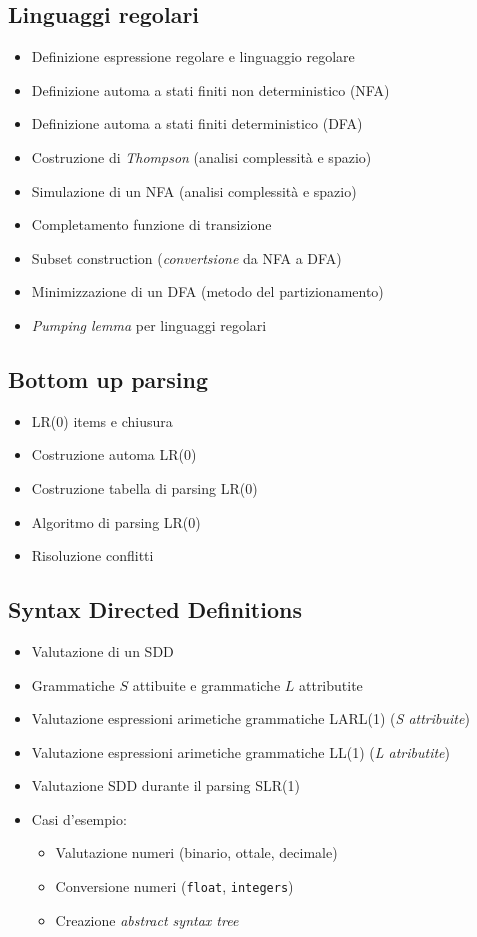 \subsection{Linguaggi regolari}
\begin{itemize}
	\item Definizione espressione regolare e linguaggio regolare
	\item Definizione automa a stati finiti non deterministico (NFA)
	\item Definizione automa a stati finiti deterministico (DFA)
	\item Costruzione di \textit{Thompson} (analisi complessità e spazio)
	\item Simulazione di un NFA (analisi complessità e spazio)
	\item Completamento funzione di transizione
	\item Subset construction (\textit{convertsione} da NFA a DFA)
	\item Minimizzazione di un DFA (metodo del partizionamento)
	\item \textit{Pumping lemma} per linguaggi regolari
\end{itemize}
\subsection{Bottom up parsing}
\begin{itemize}
	\item LR(0) items e chiusura
	\item Costruzione automa LR(0)
	\item Costruzione tabella di parsing LR(0)
	\item Algoritmo di parsing LR(0)
	\item Risoluzione conflitti
\end{itemize}

\subsection{Syntax Directed Definitions}
\begin{itemize}
	\item Valutazione di un SDD
	\item Grammatiche $ S $ attibuite e grammatiche $ L $ attributite
	\item Valutazione espressioni arimetiche grammatiche LARL(1) (\textit{S attribuite})
	\item Valutazione espressioni arimetiche grammatiche LL(1) (\textit{L atributite})
	\item Valutazione SDD durante il parsing SLR(1)
	\item Casi d'esempio:
	      \begin{itemize}
		      \item Valutazione numeri (binario, ottale, decimale)
		      \item Conversione numeri (\verb|float|, \verb|integers|)
		      \item Creazione \textit{abstract syntax tree}
	      \end{itemize}
\end{itemize}
